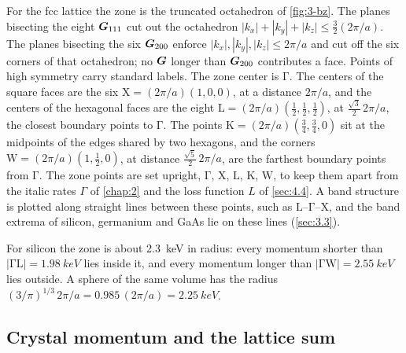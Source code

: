 For the fcc lattice the zone is the truncated octahedron of \cref{fig:3-bz}. The planes bisecting the eight $\bm{G}_{111}$ cut out the octahedron $|k_x| + |k_y| + |k_z| \le \tfrac32(2\pi/a)$. The planes bisecting the six $\bm{G}_{200}$ enforce $|k_x|, |k_y|, |k_z| \le 2\pi/a$ and cut off the six corners of that octahedron; no $\bm{G}$ longer than $\bm{G}_{200}$ contributes a face. Points of high symmetry carry standard labels. The zone center is $\mathrm{\Gamma}$. The centers of the square faces are the six $\mathrm{X} = (2\pi/a)(1,0,0)$, at a distance $2\pi/a$, and the centers of the hexagonal faces are the eight $\mathrm{L} = (2\pi/a)(\tfrac12,\tfrac12,\tfrac12)$, at $\tfrac{\sqrt3}{2}\,2\pi/a$, the closest boundary points to $\mathrm{\Gamma}$. The points $\mathrm{K} = (2\pi/a)(\tfrac34,\tfrac34,0)$ sit at the midpoints of the edges shared by two hexagons, and the corners $\mathrm{W} = (2\pi/a)(1,\tfrac12,0)$, at distance $\tfrac{\sqrt5}{2}\,2\pi/a$, are the farthest boundary points from $\mathrm{\Gamma}$. The zone points are set upright, $\mathrm{\Gamma}$, $\mathrm{X}$, $\mathrm{L}$, $\mathrm{K}$, $\mathrm{W}$, to keep them apart from the italic rates $\varGamma$ of \cref{chap:2} and the loss function $L$ of \cref{sec:4.4}. A band structure is plotted along straight lines between these points, such as $\mathrm{L}$--$\mathrm{\Gamma}$--$\mathrm{X}$, and the band extrema of silicon, germanium and GaAs lie on these lines (\cref{sec:3.3}).

For silicon the zone is about \SI{2.3}{keV} in radius: every momentum shorter than $|\mathrm{\Gamma L}| = \SI{1.98}{keV}$ lies inside it, and every momentum longer than $|\mathrm{\Gamma W}| = \SI{2.55}{keV}$ lies outside. A sphere of the same volume has the radius $(3/\pi)^{1/3}\,2\pi/a = 0.985\,(2\pi/a) = \SI{2.25}{keV}$.

\subsection{Crystal momentum and the lattice sum}

